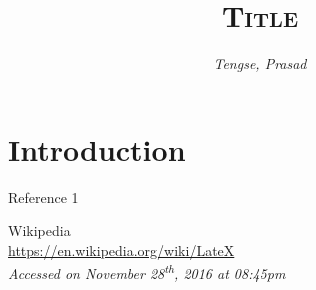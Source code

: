 \documentclass[11pt]{article}
\title{\vspace{-7ex}\textsc{Title}\vspace{-2ex}}
\author{\emph{Tengse, Prasad}\\}
\date{}
\begin{document}
		\tableofcontents
		\listoffigures
		\pagebreak


\section{Introduction}
\hspace{1.5ex}



\begin{thebibliography}{10}
	Reference 1

	Wikipedia \\
	\url{https://en.wikipedia.org/wiki/LateX}\\
	\textit{Accessed on November 28\textsuperscript{th}, 2016 at 08:45pm}



\end{thebibliography}
\pagebreak

\end{document}
